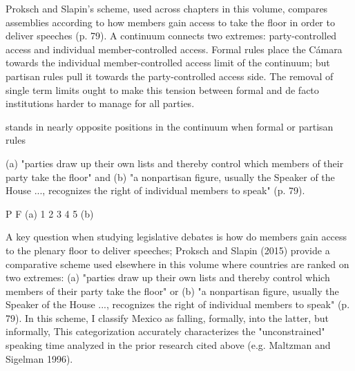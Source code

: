 

Proksch and Slapin's \citeyearpar{proksch-slapin2015book} scheme, used across chapters in this volume, compares assemblies according to how members gain access to take the floor in order to deliver speeches (p. 79). A continuum connects two extremes: party-controlled access and individual member-controlled access. Formal rules place the Cámara towards the individual member-controlled access limit of the continuum; but partisan rules pull it towards the party-controlled access side. The removal of single term limits ought to make this tension between formal and de facto institutions harder to manage for all parties.  



stands in nearly opposite positions in the continuum when formal or partisan rules 

(a) "parties draw up their own lists and thereby control which members of their party take the floor" and (b) "a nonpartisan figure, usually the Speaker of the House ..., recognizes the right of individual members to speak" (p. 79). 


       P        F
(a) 1  2  3  4  5 (b)

A key question when studying legislative debates is how do members gain access to the plenary floor to deliver speeches; Proksch and Slapin (2015) provide a comparative scheme used elsewhere in this volume where countries are ranked on two extremes: (a) "parties draw up their own lists and thereby control which members of their party take the floor" or (b) "a nonpartisan figure, usually the Speaker of the House ..., recognizes the right of individual members to speak" (p. 79). In this scheme, I classify Mexico as falling, formally, into the latter, but informally,
This categorization accurately characterizes the "unconstrained" speaking time analyzed in the prior research cited above (e.g. Maltzman and Sigelman 1996).


